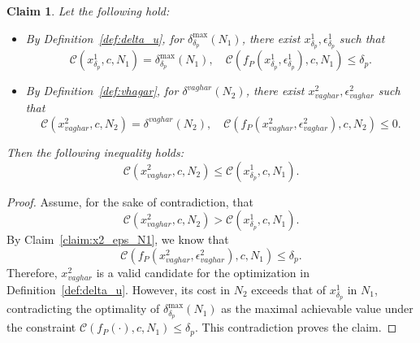 \documentclass[11pt]{article}
\newtheorem{claim}{Claim}
\begin{document}
\begin{claim}\label{claim:x2_x1_delta_p}
Let the following hold:
\begin{itemize}
    \item By Definition~\ref{def:delta_u}, for $\delta^\text{max}_{\delta_p}(N_1)$, there exist $x^1_{\delta_p}, \epsilon^1_{\delta_p}$ such that
    \[
    \mathcal{C}(x^1_{\delta_p}, c, N_1) = \delta^\text{max}_{\delta_p}(N_1), \quad \mathcal{C}(f_P(x^1_{\delta_p}, \epsilon^1_{\delta_p}), c, N_1) \leq \delta_p.
    \]
    
    \item By Definition~\ref{def:vhagar}, for $\delta^{vaghar}(N_2)$, there exist $x^2_{vaghar}, \epsilon^2_{vaghar}$ such that
    \[
    \mathcal{C}(x^2_{vaghar}, c, N_2) = \delta^{vaghar}(N_2), \quad \mathcal{C}(f_P(x^2_{vaghar}, \epsilon^2_{vaghar}), c, N_2) \leq 0.
    \]
\end{itemize}
Then the following inequality holds:
\[
\mathcal{C}(x^2_{vaghar}, c, N_2) \leq \mathcal{C}(x^1_{\delta_p}, c, N_1).
\]
\end{claim}

\begin{proof}
Assume, for the sake of contradiction, that
\[
\mathcal{C}(x^2_{vaghar}, c, N_2) > \mathcal{C}(x^1_{\delta_p}, c, N_1).
\]
By Claim~\ref{claim:x2_eps_N1}, we know that
\[
\mathcal{C}(f_P(x^2_{vaghar}, \epsilon^2_{vaghar}), c, N_1) \leq \delta_p.
\]
Therefore, $x^2_{vaghar}$ is a valid candidate for the optimization in Definition~\ref{def:delta_u}. However, its cost in $N_2$ exceeds that of $x^1_{\delta_p}$ in $N_1$, contradicting the optimality of $\delta^\text{max}_{\delta_p}(N_1)$ as the maximal achievable value under the constraint $\mathcal{C}(f_P(\cdot), c, N_1) \leq \delta_p$. This contradiction proves the claim.
\end{proof}
\end{document}
